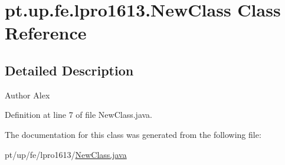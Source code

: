 \hypertarget{classpt_1_1up_1_1fe_1_1lpro1613_1_1_new_class}{}\section{pt.\+up.\+fe.\+lpro1613.\+New\+Class Class Reference}
\label{classpt_1_1up_1_1fe_1_1lpro1613_1_1_new_class}


\subsection{Detailed Description}
\begin{DoxyAuthor}{Author}
Alex 
\end{DoxyAuthor}


Definition at line 7 of file New\+Class.\+java.



The documentation for this class was generated from the following file\+:\begin{DoxyCompactItemize}
\item 
pt/up/fe/lpro1613/\hyperlink{_new_class_8java}{New\+Class.\+java}\end{DoxyCompactItemize}
